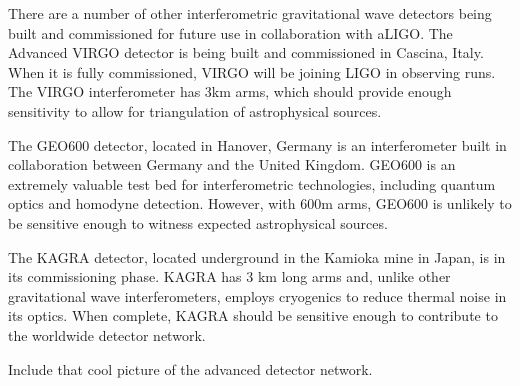There are a number of other interferometric gravitational wave detectors 
being built and commissioned for future use in collaboration with aLIGO.
The Advanced VIRGO detector is being built and commissioned in Cascina, Italy. 
When it is fully commissioned, VIRGO will be joining LIGO in observing runs. 
The VIRGO interferometer has 3km arms, which should provide enough 
sensitivity to allow for triangulation of astrophysical sources.

The GEO600 detector, located in Hanover, Germany is an interferometer built in 
collaboration between Germany and the United Kingdom. 
GEO600 is an extremely valuable test bed for interferometric technologies,
including quantum optics and homodyne detection. However, with 600m arms, GEO600 
is unlikely to be sensitive enough to witness expected astrophysical sources.

The KAGRA detector, located underground in the Kamioka mine in Japan, 
is in its commissioning phase. KAGRA has 3 km long arms and, 
unlike other gravitational wave interferometers, employs cryogenics to 
reduce thermal noise in its optics. When complete, KAGRA should be 
sensitive enough to contribute to the worldwide detector network.

Include that cool picture of the advanced detector network.
